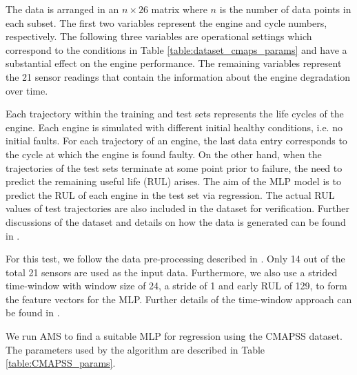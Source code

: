 \documentclass[12pt]{elsart}%
\begin{document}
The data is arranged in an $n\times26$ matrix where $n$ is the number of data points in each subset. The first two variables represent the engine and cycle numbers, respectively. The following three variables are operational settings which correspond to the conditions in Table \ref{table:dataset_cmaps_params} and have a substantial effect on the engine performance. The remaining variables represent the 21 sensor readings that contain the information about the engine degradation over time.

\begin{table}[!htb]
\begin{center}
\caption{CMAPSS dataset details.}
\label{table:dataset_cmaps_params}
\vspace{12pt}
\end{center}
\end{table}

Each trajectory within the training and test sets represents the life cycles of the engine. Each engine is simulated with different initial healthy conditions, i.e. no initial faults. For each trajectory of an engine, the last data entry corresponds to the cycle at which the engine is found faulty. On the other hand, when the trajectories of the test sets terminate at some point prior to failure, the need to predict the remaining useful life (RUL) arises. The aim of the MLP model is to predict the RUL of each engine in the test set via regression. The actual RUL values of test trajectories are also included in the dataset for verification. Further discussions of the dataset and details on how the data is generated can be found in \cite{Saxena2008}.

For this test, we follow the data pre-processing described in \cite{Laredo2018}. Only 14 out of the total 21 sensors are used as the input data. Furthermore, we also use a strided time-window with window size of 24, a stride of 1 and early RUL of 129, to form the feature vectors for the MLP. Further details of the time-window approach can be found in \cite{Laredo2018,Li2018}.

We run AMS to find a suitable MLP for regression using the CMAPSS dataset. The parameters used by the algorithm are described in Table \ref{table:CMAPSS_params}.
\end{document}
